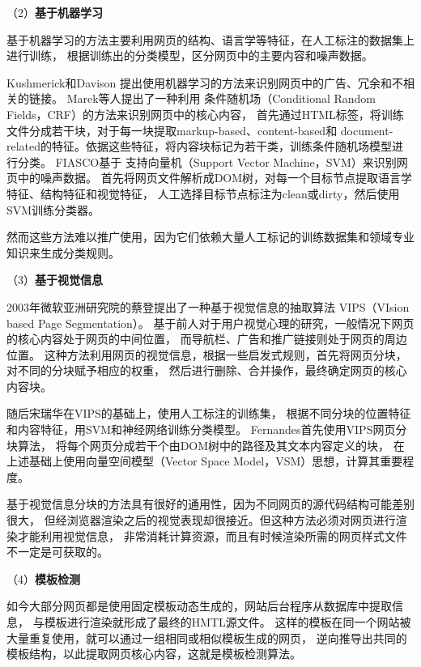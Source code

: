（2）\textbf{基于机器学习}

基于机器学习的方法主要利用网页的结构、语言学等特征，在人工标注的数据集上进行训练，
根据训练出的分类模型，区分网页中的主要内容和噪声数据。

Kushmerick和Davison
提出使用机器学习的方法来识别网页中的广告、冗余和不相关的链接。
Marek等人提出了一种利用
条件随机场（Conditional Random Fields，CRF）的方法来识别网页中的核心内容，
首先通过HTML标签，将训练文件分成若干块，对于每一块提取markup-based、content-based和
document-related的特征。依据这些特征，将内容块标记为若干类，训练条件随机场模型进行分类。
FIASCO基于
支持向量机（Support Vector Machine，SVM）来识别网页中的噪声数据。
首先将网页文件解析成DOM树，对每一个目标节点提取语言学特征、结构特征和视觉特征，
人工选择目标节点标注为clean或dirty，然后使用SVM训练分类器。

然而这些方法难以推广使用，因为它们依赖大量人工标记的训练数据集和领域专业知识来生成分类规则。

（3）\textbf{基于视觉信息}

2003年微软亚洲研究院的蔡登提出了一种基于视觉信息的抽取算法
VIPS（VIsion based Page Segmentation）。
基于前人对于用户视觉心理的研究，一般情况下网页的核心内容处于网页的中间位置，
而导航栏、广告和推广链接则处于网页的周边位置。
这种方法利用网页的视觉信息，根据一些启发式规则，首先将网页分块，对不同的分块赋予相应的权重，
然后进行删除、合并操作，最终确定网页的核心内容块。

随后宋瑞华在VIPS的基础上，使用人工标注的训练集，
根据不同分块的位置特征和内容特征，用SVM和神经网络训练分类模型。
Fernandes首先使用VIPS网页分块算法，
将每个网页分成若干个由DOM树中的路径及其文本内容定义的块，
在上述基础上使用向量空间模型（Vector Space Model，VSM）思想，计算其重要程度。

基于视觉信息分块的方法具有很好的通用性，因为不同网页的源代码结构可能差别很大，
但经浏览器渲染之后的视觉表现却很接近。但这种方法必须对网页进行渲染才能利用视觉信息，
非常消耗计算资源，而且有时候渲染所需的网页样式文件不一定是可获取的。

（4）\textbf{模板检测}

如今大部分网页都是使用固定模板动态生成的，网站后台程序从数据库中提取信息，
与模板进行渲染就形成了最终的HMTL源文件。
这样的模板在同一个网站被大量重复使用，就可以通过一组相同或相似模板生成的网页，
逆向推导出共同的模板结构，以此提取网页核心内容，这就是模板检测算法。

